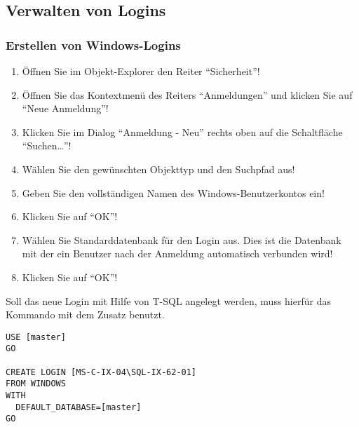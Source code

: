           \begin{literaturinternet}
            \item \cite{ms186226}
            \item \cite{ms186710}
          \end{literaturinternet}
      \subsection{Verwalten von Logins}
        \subsubsection{Erstellen von Windows-Logins}
          \begin{enumerate}
            \item Öffnen Sie im Objekt-Explorer den Reiter \enquote{Sicherheit}!
            \item Öffnen Sie das Kontextmenü des Reiters \enquote{Anmeldungen}
            und klicken Sie auf \enquote{Neue Anmeldung}!
            \item Klicken Sie im Dialog \enquote{Anmeldung - Neu} rechts oben
            auf die Schaltfläche \enquote{Suchen\ldots}!
            \item Wählen Sie den gewünschten Objekttyp und den Suchpfad aus!
            \item Geben Sie den vollständigen Namen des Windows-Benutzerkontos
            ein!
            \item Klicken Sie auf \enquote{OK}!
            \item Wählen Sie Standarddatenbank für den Login aus. Dies ist die
            Datenbank mit der ein Benutzer nach der Anmeldung automatisch
            verbunden wird!
            \item Klicken Sie auf \enquote{OK}!
          \end{enumerate}
          Soll das neue Login mit Hilfe von T-SQL angelegt werden, muss hierfür
          das Kommando  mit dem Zusatz
           benutzt.
          \begin{lstlisting}[language=ms_sql, caption={Anlegen eines
          Windows-Logins mit T-SQL}, label=admin19_08]
USE [master]
GO

CREATE LOGIN [MS-C-IX-04\SQL-IX-62-01] 
FROM WINDOWS 
WITH 
  DEFAULT_DATABASE=[master]
GO        
        \end{lstlisting}
